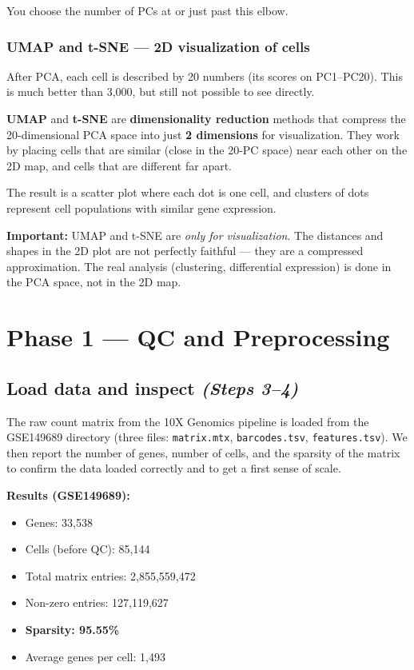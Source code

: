 \documentclass[11pt, a4paper]{article}
\begin{document}
You choose the number of PCs at or just past this elbow.

\subsubsection{UMAP and t-SNE — 2D visualization of cells}

After PCA, each cell is described by 20 numbers (its scores on PC1--PC20).
This is much better than 3,000, but still not possible to see directly.

\textbf{UMAP} and \textbf{t-SNE} are \textbf{dimensionality reduction} methods that
compress the 20-dimensional PCA space into just \textbf{2 dimensions} for visualization.
They work by placing cells that are similar (close in the 20-PC space) near each other
on the 2D map, and cells that are different far apart.

The result is a scatter plot where each dot is one cell, and clusters of dots represent
cell populations with similar gene expression.

\textbf{Important:} UMAP and t-SNE are \textit{only for visualization}.
The distances and shapes in the 2D plot are not perfectly faithful — they are a
compressed approximation. The real analysis (clustering, differential expression)
is done in the PCA space, not in the 2D map.

\section{Phase 1 — QC and Preprocessing}

\subsection{Load data and inspect \small\normalfont\textit{(Steps 3–4)}}
The raw count matrix from the 10X Genomics pipeline is loaded from the
GSE149689 directory (three files: \texttt{matrix.mtx}, \texttt{barcodes.tsv},
\texttt{features.tsv}).
We then report the number of genes, number of cells, and the sparsity of the
matrix to confirm the data loaded correctly and to get a first sense of scale.

\textbf{Results (GSE149689):}
\begin{itemize}[nosep]
  \item Genes: 33,538
  \item Cells (before QC): 85,144
  \item Total matrix entries: 2,855,559,472
  \item Non-zero entries: 127,119,627
  \item \textbf{Sparsity: 95.55\%}
  \item Average genes per cell: 1,493
\end{itemize}
\end{document}
